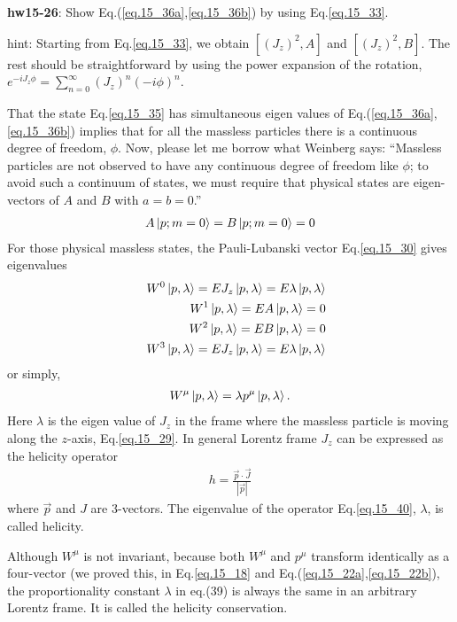 \documentclass[12pt]{article}
\begin{document}
{{{\bf hw15-26}: Show Eq.(\ref{eq.15_36a},\ref{eq.15_36b}) by using Eq.\ref{eq.15_33}.

hint: Starting from Eq.\ref{eq.15_33}, we obtain $[(J_z)^2, A]$ and $[(J_z)^2,B]$. The rest should be straightforward by using the power expansion of the
  rotation, $e^{-iJ_z \phi} = \sum_{n=0}^\infty (J_z)^n (-i\phi)^n$.

  That the state Eq.\ref{eq.15_35} has simultaneous eigen values of Eq.(\ref{eq.15_36a},\ref{eq.15_36b}) implies that for all the massless particles there is a continuous degree of freedom, $\phi$. Now, please let me borrow what Weinberg says:
  ``Massless particles are not observed to have any continuous degree of
  freedom like $\phi$; to avoid such a continuum of states, we must require
  that physical states are eigen-vectors of $A$ and $B$ with $a=b=0$.''
\begin{eqnarray}
  A \ket{p;m=0} = B \ket{p;m=0} = 0 \label{eq.15_37}
\end{eqnarray}
  For those physical massless states, the Pauli-Lubanski vector
  Eq.\ref{eq.15_30} gives eigenvalues
\begin{eqnarray}
  &&W^0 \ket{p,\lambda} = E J_z \ket{p,\lambda} = E \lambda \ket{p,\lambda} \label{eq.15_38a} \\
  &&W^1 \ket{p,\lambda} = E A   \ket{p,\lambda} = 0\label{eq.15_38b} \\
  &&W^2  \ket{p,\lambda} = E B   \ket{p,\lambda} = 0 \label{eq.15_38c} \\
  &&W^3 \ket{p,\lambda} = E J_z \ket{p,\lambda} = E \lambda \ket{p,\lambda} \label{eq.15_38d} 
\end{eqnarray}
  or simply,
\begin{eqnarray}
  W^\mu \ket{p,\lambda} = \lambda p^\mu \ket{p,\lambda}. \label{eq.15_39}
\end{eqnarray}
  Here $\lambda$ is the eigen value of $J_z$ in the frame where the massless
  particle is moving along the $z$-axis, Eq.\ref{eq.15_29}. In general Lorentz
  frame $J_z$ can be expressed as the helicity operator
\begin{eqnarray}
  h=\frac{{\vec p} \cdot {\vec J}}{|{\vec p}|} \label{eq.15_40}
\end{eqnarray}
  where ${\vec p}$ and $J$ are $3$-vectors. The
  eigenvalue of the operator Eq.\ref{eq.15_40}, $\lambda$, is called helicity.

  Although $W^\mu$ is not invariant, because both $W^\mu$ and $p^\mu$ transform
  identically as a four-vector (we proved this, in Eq.\ref{eq.15_18} and Eq.(\ref{eq.15_22a},\ref{eq.15_22b}), the proportionality constant $\lambda$ in eq.(39) is always the same in an arbitrary Lorentz frame. It is called the helicity conservation.

}}
\end{document}
